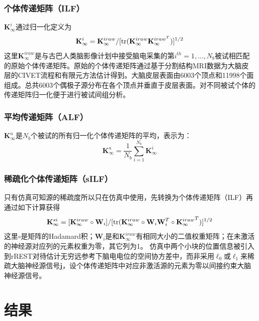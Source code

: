 \subsubsection{个体传递矩阵（ILF）}
$\mathbf{K}_{\infty}^i$通过归一化定义为
\begin{equation*}
\mathbf{K}_\infty^i=\mathbf{K}_\infty^{iraw}/{[\operatorname{tr}(\mathbf{K}_\infty^{iraw}\mathbf{K}_\infty^{{iraw}^T})]^{1/2}}
\end{equation*}
这里$\mathbf{K}_{\infty}^{iraw}$是与古巴人类脑影像计划中接受脑电采集的第$i^{th}=1,...,N_b$被试相匹配的原始个体传递矩阵。原始的个体传递矩阵通过基于分割结构MRI数据为大脑皮层的CIVET流程和有限元方法估计得到。大脑皮层表面由6003个顶点和11998个面组成。总共6003个偶极子源分布在各个顶点并垂直于皮层表面。对不同被试个体的传递矩阵归一化便于进行被试间组分析。

\subsubsection{平均传递矩阵（ALF）}
$\mathbf{K}_{\infty}^a$是$N_b$个被试的所有归一化个体传递矩阵的平均，表示为：
\begin{equation*}
\mathbf{K}_{\infty}^a=\frac{1}{N_b}\sum_{i=1}^{N_b}\mathbf{K}_{\infty}^i
\end{equation*}

\subsubsection{稀疏化个体传递矩阵（sILF）}
只有仿真可知源的稀疏度所以只在仿真中使用，先转换为个体传递矩阵（ILF）再通过如下计算获得
\begin{equation*}
\mathbf{K}_{\infty}^{si}=[\mathbf{K}_{\infty}^{iraw}\circ\mathbf{W}_i]/{[\operatorname{tr}(\mathbf{K}_{\infty}^{iraw}\circ\mathbf{W}_i\mathbf{W}_i^T\circ{\mathbf{K}_{\infty}^{iraw}}^T)]^{1/2}}
\end{equation*}
这里$\circ$是矩阵的Hadamard积；$\mathbf{W}_i$是和$\mathbf{K}_{\infty}^{iraw}$有相同大小的二值权重矩阵；在未激活的神经源对应列的元素权重为零，其它列为1。 仿真中两个小块的位置信息被引入到rREST对待估计无穷远参考下脑电电位的空间协方差中，而非采用$\ell_0$或$\ell_1$来稀疏大脑神经源信号$\mathbf{j}$，设个体传递矩阵中对应非激活源的元素为零以间接约束大脑神经源信号。

\section{结果}
